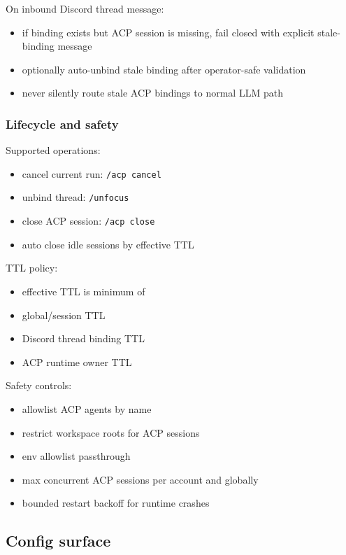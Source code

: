 On inbound Discord thread message:

\begin{itemize}
  \item if binding exists but ACP session is missing, fail closed with explicit stale-binding message
  \item optionally auto-unbind stale binding after operator-safe validation
  \item never silently route stale ACP bindings to normal LLM path
\end{itemize}


\subsubsection{Lifecycle and safety}


Supported operations:

\begin{itemize}
  \item cancel current run: \texttt{/acp cancel}
  \item unbind thread: \texttt{/unfocus}
  \item close ACP session: \texttt{/acp close}
  \item auto close idle sessions by effective TTL
\end{itemize}


TTL policy:

\begin{itemize}
  \item effective TTL is minimum of
  \item global/session TTL
  \item Discord thread binding TTL
  \item ACP runtime owner TTL
\end{itemize}


Safety controls:

\begin{itemize}
  \item allowlist ACP agents by name
  \item restrict workspace roots for ACP sessions
  \item env allowlist passthrough
  \item max concurrent ACP sessions per account and globally
  \item bounded restart backoff for runtime crashes
\end{itemize}


\subsection{Config surface}



